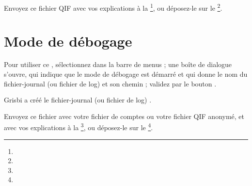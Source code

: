 Envoyez ce fichier QIF avec vos explications à la \footnote{\urlListBugsreport{}}, ou déposez-le sur le
\footnote{\urlBugTracker}.


\section{Mode de débogage\label{maintenance-debug-mode}}


Pour utiliser ce , sélectionnez  dans la barre de menus ;  une boîte de dialogue s'ouvre, qui indique que le mode de débogage est démarré et qui donne le nom du fichier-journal (ou fichier de log) et son chemin ; validez par le bouton .

Grisbi a créé le fichier-journal (ou fichier de log) .

Envoyez ce fichier avec votre fichier de comptes ou votre fichier QIF
anonymé, et avec vos explications à la \footnote{\urlListBugsreport{}}, ou déposez-le sur le
\footnote{\urlBugTracker}.


